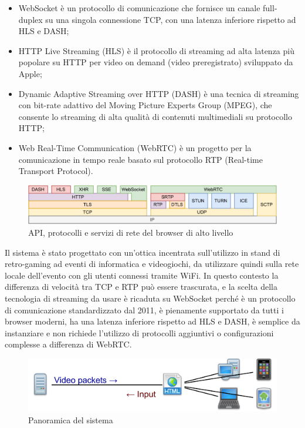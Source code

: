 \begin{itemize}
	\item WebSocket è un protocollo di comunicazione che fornisce un canale full-duplex su una singola connessione TCP, con una latenza inferiore rispetto ad HLS e DASH;
	\item HTTP Live Streaming (HLS) è il protocollo di streaming ad alta latenza più popolare su HTTP per video on demand (video preregistrato) sviluppato da Apple;
	\item Dynamic Adaptive Streaming over HTTP (DASH) è una tecnica di streaming con bit-rate adattivo del Moving Picture Experts Group (MPEG), che consente lo streaming di alta qualità di contenuti multimediali su protocollo HTTP;
	\item Web Real-Time Communication (WebRTC) è un progetto per la comunicazione in tempo reale basato sul protocollo RTP (Real-time Transport Protocol)\cite{High_Performance_Browser_Networking}.
\end{itemize}

\begin{figure}[H]
	\includegraphics[width=\linewidth]{immagini/webprotocols}
	\caption{API, protocolli e servizi di rete del browser di alto livello}
	\label{fig:webprotocols}
\end{figure}

Il sistema è stato progettato con un'ottica incentrata sull'utilizzo in stand di retro-gaming ad eventi di informatica e videogiochi, da utilizzare quindi sulla rete locale dell'evento con gli utenti connessi tramite WiFi. In questo contesto la differenza di velocità tra TCP e RTP può essere trascurata, e la scelta della tecnologia di streaming da usare è ricaduta su WebSocket perché è un protocollo di comunicazione standardizzato dal 2011, è pienamente supportato da tutti i browser moderni, ha una latenza inferiore rispetto ad HLS e DASH, è semplice da instanziare e non richiede l'utilizzo di protocolli aggiuntivi o configurazioni complesse a differenza di WebRTC.

\begin{figure}[H]
	\includegraphics[width=\linewidth]{immagini/proposed_system}
	\caption{Panoramica del sistema}
	\label{fig:proposed_system}
\end{figure}

